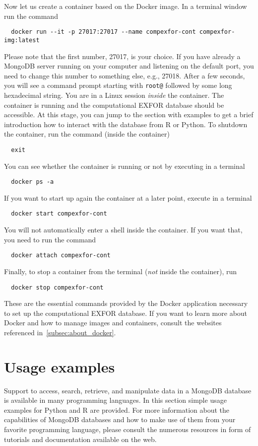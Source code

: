 \documentclass[12pt,a4paper]{scrartcl}
\begin{document}
 Now let us create a container based on the Docker image.
 In a terminal window run the command
\begin{verbatim}
  docker run --it -p 27017:27017 --name compexfor-cont compexfor-img:latest\end{verbatim}
  Please note that the first number, 27017, is your choice.
  If you have already a MongoDB server running on your computer and listening on the default port, you need to change this number to something else, e.g., 27018.  
 After a few seconds, you will see a command prompt starting with \verb#root@# followed by some long hexadecimal string.
 You are in a Linux session \textit{inside} the container.
 The container is running and the computational EXFOR database should be accessible.
 At this stage, you can jump to the section with examples to get a brief introduction how to interact with the database from R or Python.
 To shutdown the container, run the command (inside the container)
\begin{verbatim}
  exit
\end{verbatim}
You can see whether the container is running or not by executing in a terminal
\begin{verbatim}
  docker ps -a
\end{verbatim}
 If you want to start up again the container at a later point, execute in a terminal
\begin{verbatim}
  docker start compexfor-cont
\end{verbatim} 
 You will not automatically enter a shell inside the container.
 If you want that, you need to run the command
\begin{verbatim}
  docker attach compexfor-cont
\end{verbatim}
Finally, to stop a container from the terminal (\textit{not} inside the container), run
\begin{verbatim}
  docker stop compexfor-cont
\end{verbatim}
These are the essential commands provided by the Docker application necessary to set up the computational EXFOR database.
If you want to learn more about Docker and how to manage images and containers, consult the websites referenced in~\cref{subsec:about_docker}.

 \section{Usage examples}
 \label{sec:usage_examples}
 Support to access, search, retrieve, and manipulate data in a MongoDB database is available in many programming languages.
 In this section simple usage examples for Python and R are provided.
 For more information about the capabilities of MongoDB databases and how to make use of them from your favorite programming language, please consult the numerous resources in form of tutorials and documentation available on the web.
 
\end{document}

